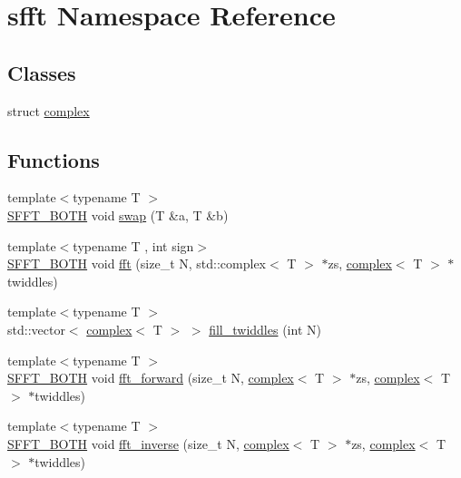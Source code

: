 \hypertarget{namespacesfft}{}\section{sfft Namespace Reference}
\label{namespacesfft}
\subsection*{Classes}
\begin{DoxyCompactItemize}
\item 
struct \hyperlink{structsfft_1_1complex}{complex}
\end{DoxyCompactItemize}
\subsection*{Functions}
\begin{DoxyCompactItemize}
\item 
{\footnotesize template$<$typename T $>$ }\\\hyperlink{simplefft_8h_acfebaca1d9d8f48864704773594876b7}{S\+F\+F\+T\+\_\+\+B\+O\+TH} void \hyperlink{namespacesfft_a6fd4eed54bb67483098b21032bf68bf5}{swap} (T \&a, T \&b)
\item 
{\footnotesize template$<$typename T , int sign$>$ }\\\hyperlink{simplefft_8h_acfebaca1d9d8f48864704773594876b7}{S\+F\+F\+T\+\_\+\+B\+O\+TH} void \hyperlink{namespacesfft_afe126ab208ddda6ebf1082ba5fccf97c}{fft} (size\+\_\+t N, std\+::complex$<$ T $>$ $\ast$zs, \hyperlink{structsfft_1_1complex}{complex}$<$ T $>$ $\ast$twiddles)
\item 
{\footnotesize template$<$typename T $>$ }\\std\+::vector$<$ \hyperlink{structsfft_1_1complex}{complex}$<$ T $>$ $>$ \hyperlink{namespacesfft_adb7a1a523f70985b8e7c17bcb6e1c30f}{fill\+\_\+twiddles} (int N)
\item 
{\footnotesize template$<$typename T $>$ }\\\hyperlink{simplefft_8h_acfebaca1d9d8f48864704773594876b7}{S\+F\+F\+T\+\_\+\+B\+O\+TH} void \hyperlink{namespacesfft_af570d5b3d61e3da21700a7ba5773e00a}{fft\+\_\+forward} (size\+\_\+t N, \hyperlink{structsfft_1_1complex}{complex}$<$ T $>$ $\ast$zs, \hyperlink{structsfft_1_1complex}{complex}$<$ T $>$ $\ast$twiddles)
\item 
{\footnotesize template$<$typename T $>$ }\\\hyperlink{simplefft_8h_acfebaca1d9d8f48864704773594876b7}{S\+F\+F\+T\+\_\+\+B\+O\+TH} void \hyperlink{namespacesfft_aa248f213f81b23b17801fc26fd2e0324}{fft\+\_\+inverse} (size\+\_\+t N, \hyperlink{structsfft_1_1complex}{complex}$<$ T $>$ $\ast$zs, \hyperlink{structsfft_1_1complex}{complex}$<$ T $>$ $\ast$twiddles)
\end{DoxyCompactItemize}


